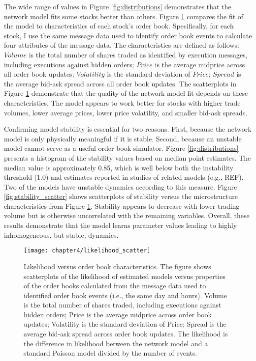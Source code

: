 		The wide range of values in Figure \ref{fig:distributions} demonstrates that the network model fits some stocks better than others. Figure \ref{fig:likelihood_scatter} compares the fit of the model to characteristics of each stock’s order book. Specifically, for each stock, I use the same message data used to identify order book events to calculate four attributes of the message data. The characteristics are defined as follows: $Volume$ is the total number of shares traded as identified by execution messages, including executions against hidden orders; $Price$ is the average midprice across all order book updates; $Volatility$ is the standard deviation of $Price$; $Spread$ is the average bid-ask spread across all order book updates. The scatterplots in Figure \ref{fig:likelihood_scatter} demonstrate that the quality of the network model fit depends on these characteristics. The model appears to work better for stocks with higher trade volumes, lower average prices, lower price volatility, and smaller bid-ask spreads.

		Confirming model stability is essential for two reasons. First, because the network model is only physically meaningful if it is stable. Second, because an unstable model cannot serve as a useful order book simulator. Figure \ref{fig:distributions} presents a histogram of the stability values based on median point estimates. The median value is approximately 0.85, which is well below both the instability threshold (1.0) and estimates reported in studies of related models (e.g., REF). Two of the models have unstable dynamics according to this measure. Figure \ref{fig:stability_scatter} shows scatterplots of stability versus the microstructure characteristics from Figure \ref{fig:likelihood_scatter}. Stability appears to decrease with lower trading volume but is otherwise uncorrelated with the remaining variables. Overall, these results demonstrate that the model learns parameter values leading to highly inhomogeneous, but stable, dynamics.

		\begin{figure}[p]
			\small
			\linespread{1}
			\centering
			\texttt{[image: chapter4/likelihood\_scatter]}
			\captionsetup{skip=-20pt, position=below, font=footnotesize, justification=justified, width=\linewidth}
			\caption[Likelihood versus order book characteristics]{Likelihood versus order book characteristics. The figure shows scatterplots of the likelihood of estimated models versus properties of the order books calculated from the message data used to identified order book events (i.e., the same day and hours). Volume is the total number of shares traded, including executions against hidden orders; Price is the average midprice across order book updates; Volatility is the standard deviation of Price; Spread is the average bid-ask spread across order book updates. The likelihood is the difference in likelihood between the network model and a standard Poisson model divided by the number of events.}
			\label{fig:likelihood_scatter}
		\end{figure}

